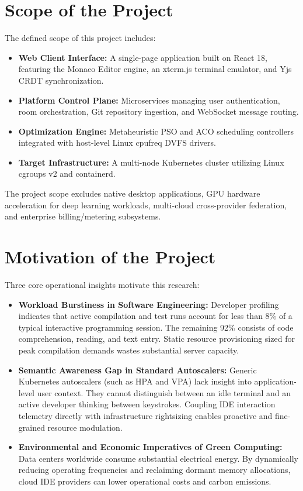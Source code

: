\documentclass[12pt,a4paper]{report}
\begin{document}
\section{Scope of the Project}
The defined scope of this project includes:
\begin{itemize}
    \item \textbf{Web Client Interface:} A single-page application built on React 18, featuring the Monaco Editor engine, an xterm.js terminal emulator, and Yjs CRDT synchronization.
    \item \textbf{Platform Control Plane:} Microservices managing user authentication, room orchestration, Git repository ingestion, and WebSocket message routing.
    \item \textbf{Optimization Engine:} Metaheuristic PSO and ACO scheduling controllers integrated with host-level Linux cpufreq DVFS drivers.
    \item \textbf{Target Infrastructure:} A multi-node Kubernetes cluster utilizing Linux cgroups v2 and containerd.
\end{itemize}

The project scope excludes native desktop applications, GPU hardware acceleration for deep learning workloads, multi-cloud cross-provider federation, and enterprise billing/metering subsystems.

\section{Motivation of the Project}
Three core operational insights motivate this research:
\begin{itemize}
    \item \textbf{Workload Burstiness in Software Engineering:} Developer profiling indicates that active compilation and test runs account for less than 8\% of a typical interactive programming session. The remaining 92\% consists of code comprehension, reading, and text entry. Static resource provisioning sized for peak compilation demands wastes substantial server capacity.
    \item \textbf{Semantic Awareness Gap in Standard Autoscalers:} Generic Kubernetes autoscalers (such as HPA and VPA) lack insight into application-level user context. They cannot distinguish between an idle terminal and an active developer thinking between keystrokes. Coupling IDE interaction telemetry directly with infrastructure rightsizing enables proactive and fine-grained resource modulation.
    \item \textbf{Environmental and Economic Imperatives of Green Computing:} Data centers worldwide consume substantial electrical energy. By dynamically reducing operating frequencies and reclaiming dormant memory allocations, cloud IDE providers can lower operational costs and carbon emissions.
\end{itemize}
\end{document}

